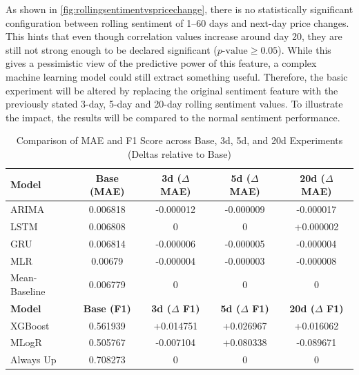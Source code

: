 \documentclass[Master,english,IEEE]{twbook}
\begin{document}
As shown in \ref{fig:rollingsentimentvspricechange}, there is no statistically significant configuration between rolling sentiment of 1–60 days and next-day price changes. This hints that even though correlation values increase around day 20, they are still not strong enough to be declared significant ($p\text{-value} \ge 0.05$). While this gives a pessimistic view of the predictive power of this feature, a complex machine learning model could still extract something useful. Therefore, the basic experiment will be altered by replacing the original sentiment feature with the previously stated 3-day, 5-day and 20-day rolling sentiment values. To illustrate the impact, the results will be compared to the normal sentiment performance.

\begin{table}[H]
    \centering
    \small %
    \setlength{\tabcolsep}{4pt} %
    \begin{tabular}{|lcccc|}
        \hline
        \textbf{Model} & \textbf{Base (MAE)} & \textbf{3d ($\Delta$ MAE)} & \textbf{5d ($\Delta$ MAE)} & \textbf{20d ($\Delta$ MAE)} \\
        \hline
        ARIMA          & 0.006818            & \cellcolor{green!20}-0.000012        & \cellcolor{green!20}-0.000009        & \cellcolor{green!20}-0.000017        \\
        LSTM           & 0.006808            & 0                                    & 0                                    & \cellcolor{red!20}+0.000002      \\
        GRU            & 0.006814            & \cellcolor{green!20}-0.000006        & \cellcolor{green!20}-0.000005        & \cellcolor{green!20}-0.000004        \\
        MLR            & 0.00679             & \cellcolor{green!20}-0.000004        & \cellcolor{green!20}-0.000003        & \cellcolor{green!20}-0.000008        \\
        Mean-Baseline  & 0.006779            & 0                                    & 0                                    & 0                                 \\
        \hline
        \textbf{Model} & \textbf{Base (F1)}  & \textbf{3d ($\Delta$ F1)}   & \textbf{5d ($\Delta$ F1)}   & \textbf{20d ($\Delta$ F1)}  \\
        \hline
        XGBoost        & 0.561939            & \cellcolor{green!20}+0.014751      & \cellcolor{green!20}+0.026967      & \cellcolor{green!20}+0.016062      \\
        MLogR          & 0.505767            & \cellcolor{red!20}-0.007104        & \cellcolor{green!20}+0.080338      & \cellcolor{red!20}-0.089671        \\
        Always Up      & 0.708273            & 0                                  & 0                                  & 0                                 \\
        \hline
    \end{tabular}
    \caption{Comparison of MAE and F1 Score across Base, 3d, 5d, and 20d Experiments (Deltas relative to Base)}
    \label{tab:comp_rolling_sentiment}
\end{table}
\end{document}
